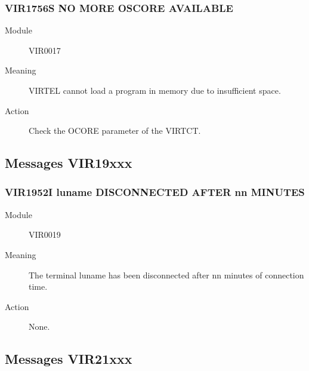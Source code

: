 \documentclass[letterpaper,10pt,english]{sphinxmanual}
\begin{document}
\subsubsection{VIR1756S NO MORE OSCORE AVAILABLE}
\label{\detokenize{messages:vir1756s-no-more-oscore-available}}\begin{description}
\item[{Module}] \leavevmode
VIR0017

\item[{Meaning}] \leavevmode
VIRTEL cannot load a program in memory due to insufficient space.

\item[{Action}] \leavevmode
Check the OCORE parameter of the VIRTCT.

\end{description}


\subsection{Messages VIR19xxx}
\label{\detokenize{messages:messages-vir19xxx}}

\subsubsection{VIR1952I luname DISCONNECTED AFTER nn MINUTES}
\label{\detokenize{messages:vir1952i-luname-disconnected-after-nn-minutes}}\begin{description}
\item[{Module}] \leavevmode
VIR0019

\item[{Meaning}] \leavevmode
The terminal luname has been disconnected after nn minutes of connection time.

\item[{Action}] \leavevmode
None.

\end{description}


\subsection{Messages VIR21xxx}
\label{\detokenize{messages:messages-vir21xxx}}
\end{document}
